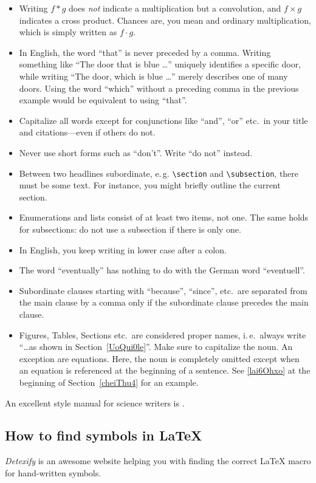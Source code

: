 \begin{itemize}
	\item Writing $f * g$ does \emph{not} indicate a multiplication but a
	convolution, and $f \times g$ indicates a cross product.
	Chances are, you mean and ordinary multiplication, which is simply written
	as $f \cdot g$.
	\item In English, the word ``that'' is never preceded by a comma.
	Writing something like ``The door that is blue \ldots'' uniquely identifies
	a specific door, while writing ``The door, which is blue \ldots'' merely
	describes one of many doors.
	Using the word ``which'' without a preceding comma in the previous example
	would be equivalent to using ``that''.
	\item Capitalize all words except for conjunctions like ``and'',
	``or'' etc.\ in your title and citations---even if others do not.
	\item Never use short forms such as ``don't''.
	Write ``do not'' instead.
	\item Between two headlines subordinate, e.\,g.
	\texttt{\textbackslash{}section} and \texttt{\textbackslash{}subsection},
	there must be some text.
	For instance, you might briefly outline the current section.
	\item Enumerations and lists consist of at least two items, not one.
	The same holds for subsections: do not use a subsection if there is only
	one.
	\item In English, you keep writing in lower case after a colon.
	\item The word ``eventually'' has nothing to do with the German word
	``eventuell''.
	\item Subordinate clauses starting with ``because'', ``since'', etc.\ are
	separated from the main clause by a comma only if the subordinate clause
	precedes the main clause.
	\item Figures, Tables, Sections etc.\ are considered proper names, i.\,e.\
	always write ``\ldots as shown in Section~\ref{UoQui0le}''.
	Make sure to capitalize the noun.
	An exception are equations.
	Here, the noun is completely omitted except when an equation is referenced
	at the beginning of a sentence.
	See \eqref{lai6Ohxo} at the beginning of Section~\ref{cheiThu4} for an
	example.
\end{itemize}
An excellent style manual for science writers is \cite{b7}.


\subsection{How to find symbols in \LaTeX}
\emph{Detexify} \cite{b9} is an awesome website helping you with finding the
correct \LaTeX{} macro for hand-written symbols.


